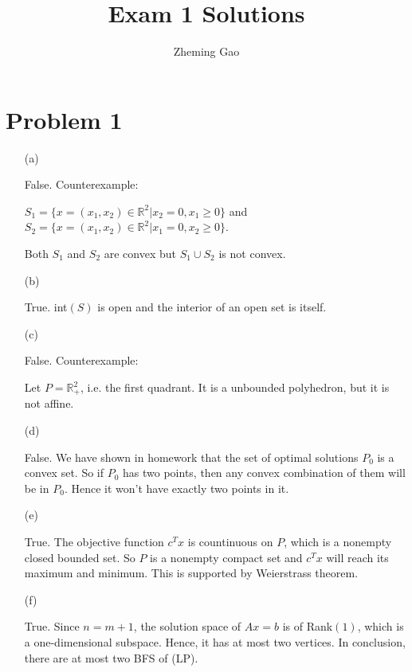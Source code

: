 \documentclass[12pt]{article}
\begin{document}
 
 
\title{Exam 1 Solutions}
\author{Zheming Gao}
\maketitle

\section*{Problem 1}

\begin{enumerate}
\item [(a)]

False. Counterexample:

$S_1 = \{ x = (x_1, x_2) \in \mathbb R^2 | x_2 = 0, x_1 \geqslant 0\}$ and $S_2 = \{ x = (x_1, x_2) \in \mathbb R^2 | x_1 = 0, x_2 \geqslant 0\}$.

Both $S_1$ and $S_2$ are convex but $S_1 \cup S_2$ is not convex.

\item[(b)]

True. int$(S)$ is open and the interior of an open set is itself.

\item [(c)]

False. Counterexample:

Let $P = \mathbb R_+^2$, i.e. the first quadrant. It is a unbounded polyhedron, but it is not affine. 

\item[(d)]

False. We have shown in homework that the set of optimal solutions $P_0$ is a convex set. So if $P_0$ has two points, then any convex combination of them will be in $P_0$. Hence it won't have exactly two points in it.

\item[(e)]

True. The objective function $c^Tx$ is countinuous on $P$, which is a nonempty closed bounded set. So $P$ is a nonempty compact set and $c^Tx$ will reach its maximum and minimum. This is supported by Weierstrass theorem.

\item[(f)]

True. Since $n = m + 1$, the solution space of $Ax=b$ is of Rank$(1)$, which is a one-dimensional subspace. Hence, it has at most two vertices. In conclusion, there are at most two BFS of (LP).


\end{enumerate}
\end{document}
